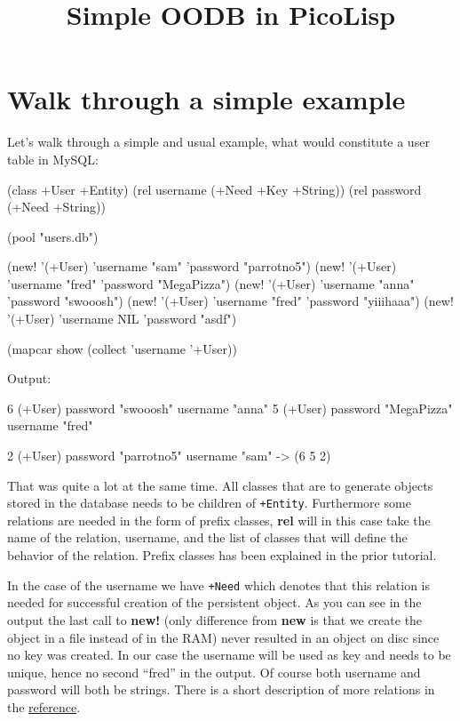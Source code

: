 \title{Simple OODB in PicoLisp}

\maketitle

\section{Walk through a simple  example}
\label{sec:simple-oodb-walk-through-a-simple-example}

Let's walk through a simple and usual example, what would constitute a
user table in MySQL:

\begin{wideverbatim}
(class +User +Entity)
(rel username (+Need +Key +String))
(rel password (+Need +String))

(pool "users.db")

(new! '(+User) 'username "sam" 'password "parrotno5")
(new! '(+User) 'username "fred" 'password "MegaPizza")
(new! '(+User) 'username "anna" 'password "swooosh")
(new! '(+User) 'username "fred" 'password "yiiihaaa")
(new! '(+User) 'username NIL 'password "asdf")

(mapcar show (collect 'username '+User))
\end{wideverbatim}

Output:

\begin{wideverbatim}
{6} (+User)
   password "swooosh"
   username "anna"
{5} (+User)
   password "MegaPizza"
   username "fred"

\end{wideverbatim}

\begin{wideverbatim}

{2} (+User)
   password "parrotno5"
   username "sam"
-> ({6} {5} {2})

\end{wideverbatim}

That was quite a lot at the same time. All classes that are to
generate objects stored in the database needs to be children of
\texttt{+Entity}. Furthermore some relations are needed in the form of
prefix classes, \textbf{rel} will in this case take the name of the
relation, username, and the list of classes that will define the
behavior of the relation. Prefix classes has been explained in the
prior tutorial.

In the case of the username we have \texttt{+Need} which denotes that
this relation is needed for successful creation of the persistent
object. As you can see in the output the last call to \textbf{new!}
(only difference from \textbf{new} is that we create the object in a
file instead of in the RAM) never resulted in an object on disc since
no key was created. In our case the username will be used as key and
needs to be unique, hence no second ``fred'' in the output. Of course
both username and password will both be strings. There is a short
description of more relations in the
\href{http://www.software-lab.de/ref.html#dbase}{reference}.

